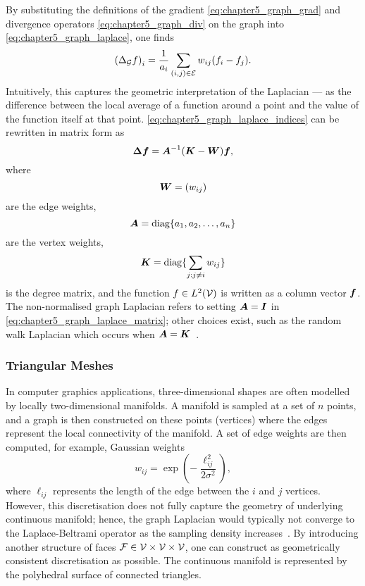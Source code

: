 By substituting the definitions of the gradient \cref{eq:chapter5_graph_grad} and divergence operators \cref{eq:chapter5_graph_div} on the graph into \cref{eq:chapter5_graph_laplace}, one finds
%
\begin{equation}\label{eq:chapter5_graph_laplace_indices}
	{(\Delta_{\mathcal{G}} f)}_{i}
	= \frac{1}{a_{i}} \sum\limits_{(i,j) \in \mathcal{E}} w_{i j} (f_{i} - f_{j}).
\end{equation}
%
Intuitively, this captures the geometric interpretation of the Laplacian --- as the difference between the local average of a function around a point and the value of the function itself at that point.
\cref{eq:chapter5_graph_laplace_indices} can be rewritten in matrix form as
%
\begin{equation}\label{eq:chapter5_graph_laplace_matrix}
	\vb*{\Delta} \vb*{f}
	= \vb*{A}^{-1} (\vb*{K} - \vb*{W}) \vb*{f},
\end{equation}
%
where
%
\begin{equation}
	\vb*{W}
	= (w_{i j})
\end{equation}
%
are the edge weights,
%
\begin{equation}
	\vb*{A}
	= \text{diag}\{a_{1},a_{2},\ldots,a_{n}\}
\end{equation}
%
are the vertex weights,
%
\begin{equation}
	\vb*{K}
	= \text{diag}\{\sum\limits_{j: j \neq i} w_{i j}\}
\end{equation}
%
is the degree matrix, and the function \(f \in L^{2}(\mathcal{V})\) is written as a column vector \(\vb*{f}\).
The non-normalised graph Laplacian refers to setting \(\vb*{A} = \vb*{I}\) in \cref{eq:chapter5_graph_laplace_matrix}; other choices exist, such as the random walk Laplacian which occurs when \(\vb*{A} = \vb*{K}\)~\cite{VonLuxburg2007}.

\subsubsection{Triangular Meshes}

In computer graphics applications, three-dimensional shapes are often modelled by locally two-dimensional manifolds.
A manifold is sampled at a set of \(n\) points, and a graph is then constructed on these points (vertices) where the edges represent the local connectivity of the manifold.
A set of edge weights are then computed, for example, Gaussian weights
%
\begin{equation}
	w_{i j}
	= \exp(-\frac{\ell_{i j}^{2}}{2\sigma^{2}}),
\end{equation}
%
where \(\ell_{i j}\) represents the length of the edge between the \(i\) and \(j\) vertices.
However, this discretisation does not fully capture the geometry of underlying continuous manifold; hence, the graph Laplacian would typically not converge to the Laplace-Beltrami operator as the sampling density increases~\cite{Bronstein2017,Wardetzky2007}.
By introducing another structure of faces \(\mathcal{F} \in \mathcal{V} \times \mathcal{V} \times \mathcal{V}{}\), one can construct as geometrically consistent discretisation as possible.
The continuous manifold is represented by the polyhedral surface of connected triangles.

